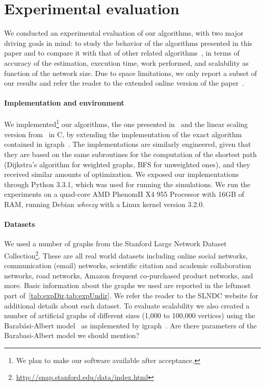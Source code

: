 \section{Experimental evaluation}\label{sec:exper}
We conducted an experimental evaluation of our algorithms, with two major
driving goals in mind: to study the behavior of the algorithms presented in this
paper and to compare it with that of other related
algorithms~\citep{Brandes01,BrandesP07,JacobKLPT05,GeisbergerSS08}, in terms of
accuracy of the estimation, execution time, work performed, and scalability as
function of the network size. Due to space limitations, we only report a subset
of our results and refer the reader to the extended online version of the
paper~\citep{Anonymous13}.

\paragraph{Implementation and environment}
We implemented\footnote{We plan to make our software available after
acceptance.} our algorithms, the one presented in~\citep{BrandesP07,JacobKLPT05}
and the linear scaling version from~\citep{GeisbergerSS08} in C, by extending
the implementation of the exact algorithm~\citep{Brandes01} contained in
igraph~\citep{igraph}. The implementations are similarly engineered, given that
they are based on the same subroutines for the computation of the shortest path
(Dijkstra's algorithm for weighted graphs, BFS for unweighted ones), and they
received similar amounts of optimization. We exposed our implementations through
Python 3.3.1, which was used for running the simulations. We run the experiments
on a quad-core AMD Phenom\texttrademark II X4 955 Processor with 16GB of RAM,
running Debian \emph{wheezy} with a Linux kernel version 3.2.0.

\paragraph{Datasets} We used a number of graphs from the Stanford Large
Network Dataset
Collection\footnote{\url{http://snap.stanford.edu/data/index.html}}. These are
all real world datasets including online social networks, communication (email)
networks, scientific citation and academic collaboration networks, road
networks, Amazon frequent co-purchased product networks, and more. Basic
information about the graphs we used are reported in the leftmost part
of~\cref{tab:expDir,tab:expUndir}. We refer the
reader to the SLNDC website for additional details about each dataset. 
To evaluate scalability we also created a number of artificial graphs of
different sizes (1,000 to 100,000 vertices) using the Barab\'asi-Albert
model~\citep{BarabasiA99} as implemented by igraph~\citep{igraph}. \XXX Are
there parameters of the Barabasi-Albert model we should mention?

